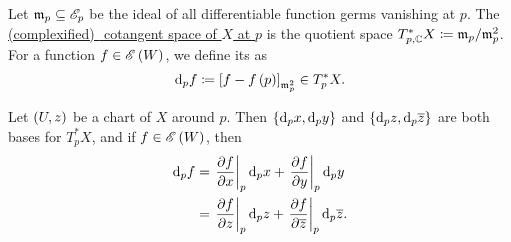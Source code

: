 \documentclass[../Moduli_Spaces_of_Riemann_Surfaces.tex]{subfiles}
\begin{document}
    \begin{definition}
        Let $\mathfrak{m}_p\subseteq\mathscr{E}_p$ be the ideal of all differentiable function germs vanishing at $p$. The \ul{(complexified) $\!\!\!\!$ \footnotemark cotangent space of $X$ at $p$} is the quotient space $T_{p,\mathbb{C}}^\ast X\coloneqq\mathfrak{m}_p/\mathfrak{m}^2_p$. For a function $f\in\mathscr{E}\left(W\right)$, we define its  as
        \begin{equation*}
            \mathrm{d}_pf\coloneqq\left[f-f\left(p\right)\right]_{\mathfrak{m}_p^2}\in T_p^\ast X.
        \end{equation*}
    \end{definition}
    \begin{proposition}
        Let $\left(U,z\right)$ be a chart of $X$ around $p$. Then $\left\{\mathrm{d}_px,\mathrm{d}_py\right\}$ and $\left\{\mathrm{d}_pz,\mathrm{d}_p\overline{z}\right\}$ are both bases for $T_p^\ast X$, and if $f\in\mathscr{E}\left(W\right)$, then
        \begin{equation*}
            \begin{aligned}
                \mathrm{d}_pf&=\left.\frac{\partial f}{\partial x}\right|_p\mathrm{d}_px+\left.\frac{\partial f}{\partial y}\right|_p\mathrm{d}_py \\
                     &=\left.\frac{\partial f}{\partial z}\right|_p\mathrm{d}_pz+\left.\frac{\partial f}{\partial\overline{z}}\right|_p\mathrm{d}_p\overline{z}.
            \end{aligned}
        \end{equation*}
    \end{proposition}
\end{document}
